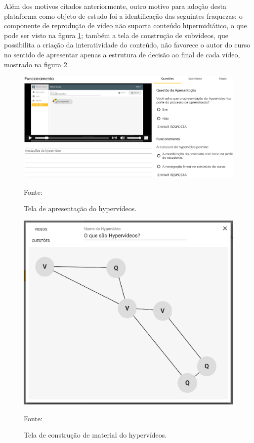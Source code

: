 Além dos motivos citados anteriormente, outro motivo para adoção desta plataforma como objeto de estudo foi a identificação das seguintes fraquezas: o componente de reprodução de vídeo não suporta conteúdo hipermidiático, o que pode ser visto na figura \ref{fig:hyp_reprod}; também a tela de construção de subvídeos, que possibilita a criação da interatividade do conteúdo, não favorece o autor do curso no sentido de apresentar apenas a estrutura de decisão ao final de cada vídeo, mostrado na figura \ref{fig:hyp_constr}.

\begin{figure}[h!]
	\centering
  	\includegraphics[width=.9\linewidth]{figuras/reproducao_hyp.eps}
  	\caption{Tela de apresentação do hypervídeos.}
	\small{Fonte: \cite{arthurtcc}}
  	\label{fig:hyp_reprod}
\end{figure} 

\begin{figure}[h!]
	\centering
  	\includegraphics[width=.9\linewidth]{figuras/construcao_hyp.eps}
  	\caption{Tela de construção de material do hypervídeos.}
	\small{Fonte: \cite{arthurtcc}}
  	\label{fig:hyp_constr}
\end{figure} 

